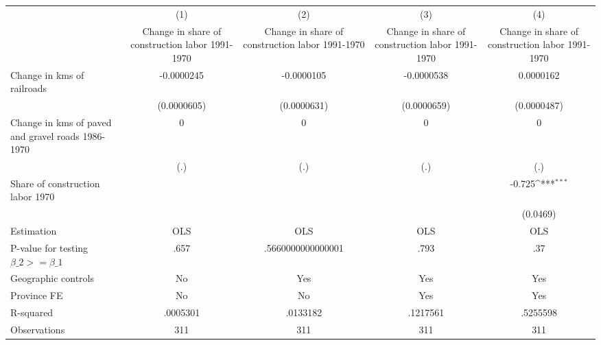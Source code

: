 {
\def\sym#1{\ifmmode^{#1}\else\(^{#1}\)\fi}
\begin{tabular}{l*{4}{c}}
\hline\hline
                &\multicolumn{1}{c}{(1)}&\multicolumn{1}{c}{(2)}&\multicolumn{1}{c}{(3)}&\multicolumn{1}{c}{(4)}\\
                &\multicolumn{1}{c}{Change in share of construction labor 1991-1970}&\multicolumn{1}{c}{Change in share of construction labor 1991-1970}&\multicolumn{1}{c}{Change in share of construction labor 1991-1970}&\multicolumn{1}{c}{Change in share of construction labor 1991-1970}\\
\hline
Change in kms of railroads&-0.0000245         &-0.0000105         &-0.0000538         &0.0000162         \\
                &(0.0000605)         &(0.0000631)         &(0.0000659)         &(0.0000487)         \\
[1em]
Change in kms of paved and gravel roads 1986-1970&        0         &        0         &        0         &        0         \\
                &      (.)         &      (.)         &      (.)         &      (.)         \\
[1em]
Share of construction labor 1970&                  &                  &                  &   -0.725\sym{***}\\
                &                  &                  &                  & (0.0469)         \\
\hline
Estimation      &      OLS         &      OLS         &      OLS         &      OLS         \\
P-value for testing $\beta\_2 >= \beta\_1$&     .657         &.5660000000000001         &     .793         &      .37         \\
Geographic controls&       No         &      Yes         &      Yes         &      Yes         \\
Province FE     &       No         &       No         &      Yes         &      Yes         \\
R-squared       & .0005301         & .0133182         & .1217561         & .5255598         \\
Observations    &      311         &      311         &      311         &      311         \\
\hline\hline
\end{tabular}
}
